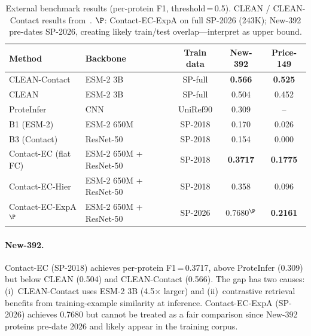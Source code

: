 \documentclass[11pt,a4paper]{article}
\begin{document}
\begin{table}[htbp]
\centering
\caption{External benchmark results (per-protein F1, threshold\,=\,0.5).
CLEAN / CLEAN-Contact results from~\citet{ayres2024}.
$\P$: Contact-EC-ExpA on full SP-2026 (243K); New-392 pre-dates SP-2026,
creating likely train/test overlap---interpret as upper bound.}
\label{tab:external}
\setlength{\tabcolsep}{4pt}
\begin{tabular}{lp{2.3cm}ccc}
\toprule
\textbf{Method} & \textbf{Backbone} & \textbf{Train data} & \textbf{New-392} & \textbf{Price-149} \\
\midrule
CLEAN-Contact~\citep{ayres2024} & ESM-2 3B  & SP-full & \textbf{0.566} & \textbf{0.525} \\
CLEAN~\citep{yu2023}            & ESM-2 3B  & SP-full & 0.504 & 0.452 \\
ProteInfer~\citep{sanderson2023}& CNN       & UniRef90 & 0.309 & -- \\
\midrule
B1 (ESM-2)           & ESM-2 650M                   & SP-2018 & 0.170 & 0.026 \\
B3 (Contact)         & ResNet-50                    & SP-2018 & 0.154 & 0.000 \\
Contact-EC (flat FC) & ESM-2 650M + ResNet-50 & SP-2018 & \textbf{0.3717} & \textbf{0.1775} \\
Contact-EC-Hier      & ESM-2 650M + ResNet-50 & SP-2018 & 0.358 & 0.096 \\
\midrule
Contact-EC-ExpA$^\P$ & ESM-2 650M + ResNet-50 & SP-2026 & 0.7680$^\P$ & \textbf{0.2161} \\
\bottomrule
\end{tabular}
\end{table}

\paragraph{New-392.}
Contact-EC (SP-2018) achieves per-protein F1\,=\,0.3717, above ProteInfer (0.309)
but below CLEAN (0.504) and CLEAN-Contact (0.566). The gap has two causes:
(i)~CLEAN-Contact uses ESM-2 3B (4.5$\times$ larger) and
(ii)~contrastive retrieval benefits from training-example similarity at inference.
Contact-EC-ExpA (SP-2026) achieves 0.7680 but cannot be treated as a fair comparison
since New-392 proteins pre-date 2026 and likely appear in the training corpus.
\end{document}
